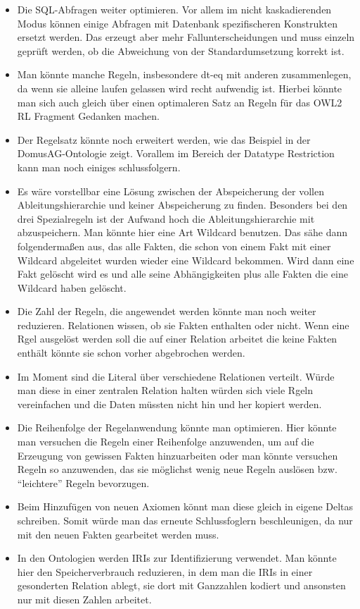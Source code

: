 \begin{itemize}
  \item Die SQL-Abfragen weiter optimieren. Vor allem im nicht kaskadierenden Modus können einige Abfragen mit Datenbank spezifischeren Konstrukten ersetzt werden. Das erzeugt aber mehr Fallunterscheidungen und muss einzeln geprüft werden, ob die Abweichung von der Standardumsetzung korrekt ist.
  \item Man könnte manche Regeln, insbesondere dt-eq mit anderen zusammenlegen, da wenn sie alleine laufen gelassen wird recht aufwendig ist. Hierbei könnte man sich auch gleich über einen optimaleren Satz an Regeln für das OWL2 RL Fragment Gedanken machen.
  \item Der Regelsatz könnte noch erweitert werden, wie das Beispiel in der DomusAG-Ontologie zeigt. Vorallem im Bereich der Datatype Restriction kann man noch einiges schlussfolgern.
  \item Es wäre vorstellbar eine Lösung zwischen der Abspeicherung der vollen Ableitungshierarchie und keiner Abspeicherung zu finden. Besonders bei den drei Spezialregeln ist der Aufwand hoch die Ableitungshierarchie mit abzuspeichern. Man könnte hier eine Art Wildcard benutzen. Das sähe dann folgendermaßen aus, das alle Fakten, die schon von einem Fakt mit einer Wildcard abgeleitet wurden wieder eine Wildcard bekommen. Wird dann eine Fakt gelöscht wird es und alle seine Abhängigkeiten plus alle Fakten die eine Wildcard haben gelöscht.
  \item Die Zahl der Regeln, die angewendet werden könnte man noch weiter reduzieren. Relationen wissen, ob sie Fakten enthalten oder nicht. Wenn eine Rgel ausgelöst werden soll die auf einer Relation arbeitet die keine Fakten enthält könnte sie schon vorher abgebrochen werden.
  \item Im Moment sind die Literal über verschiedene Relationen verteilt. Würde man diese in einer zentralen Relation halten würden sich viele Rgeln vereinfachen und die Daten müssten nicht hin und her kopiert werden.
  \item Die Reihenfolge der Regelanwendung könnte man optimieren. Hier könnte man versuchen die Regeln einer Reihenfolge anzuwenden, um auf die Erzeugung von gewissen Fakten hinzuarbeiten oder man könnte versuchen Regeln so anzuwenden, das sie möglichst wenig neue Regeln auslösen bzw. ``leichtere'' Regeln bevorzugen.
  \item Beim Hinzufügen von neuen Axiomen könnt man diese gleich in eigene Deltas schreiben. Somit würde man das erneute Schlussfoglern beschleunigen, da nur mit den neuen Fakten gearbeitet werden muss.
  \item In den Ontologien werden IRIs zur Identifizierung verwendet. Man könnte hier den Speicherverbrauch reduzieren, in dem man die IRIs in einer gesonderten Relation ablegt, sie dort mit Ganzzahlen kodiert und ansonsten nur mit diesen Zahlen arbeitet.
\end{itemize}